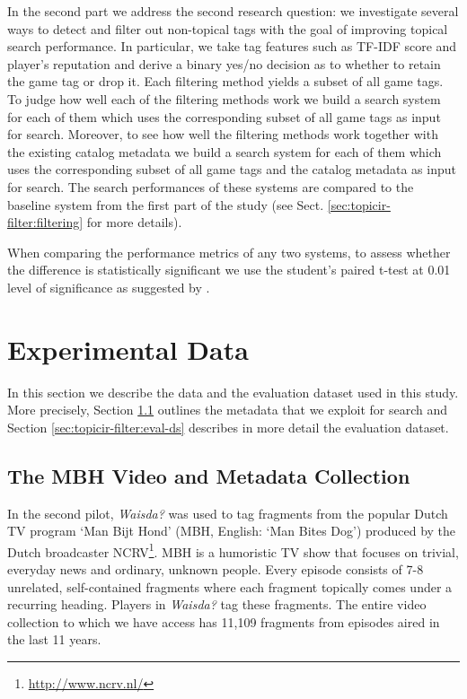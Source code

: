 In the second part we address the second research question: we investigate several ways to detect and filter out non-topical tags with the goal of improving topical search performance. In particular, we take tag features such as TF-IDF score and player's reputation and derive a binary yes/no decision as to whether to retain the game tag or drop it. Each filtering method yields a subset of all game tags. To judge how well each of the filtering methods work we build a search system for each of them which uses the corresponding subset of all game tags as input for search. Moreover, to see how well the filtering methods work together with the existing catalog metadata we build a search system for each of them which uses the corresponding subset of all game tags and the catalog metadata as input for search. The search performances of these systems are compared to the baseline system from the first part of the study (see Sect. \ref{sec:topicir-filter:filtering} for more details).

When comparing the performance metrics of any two systems, to assess whether the difference is statistically significant we use the student's paired t-test at 0.01 level of significance as suggested by \cite{stat-sig}.

\section{Experimental Data}
In this section we describe the data and the evaluation dataset used in this study. More precisely, Section \ref{sec:topicir-filter:video-metadata-collection} outlines the metadata that we exploit for search and Section \ref{sec:topicir-filter:eval-ds} describes in more detail the evaluation dataset.

\subsection{The MBH Video and Metadata Collection}\label{sec:topicir-filter:video-metadata-collection}
In the second pilot, \textit{Waisda?} was used to %
tag fragments from the popular Dutch TV program `Man Bijt Hond' (MBH, English: `Man Bites Dog') produced by the Dutch broadcaster NCRV\footnote{\url{http://www.ncrv.nl/}}.  MBH is a humoristic TV show that focuses on trivial, everyday news and ordinary, unknown people.  Every episode consists of 7-8 unrelated, self-contained fragments where each fragment topically comes under a recurring heading. Players in \textit{Waisda?} tag these fragments.  The entire video collection to which we have access has 11,109 fragments from episodes aired in the last 11 years.


